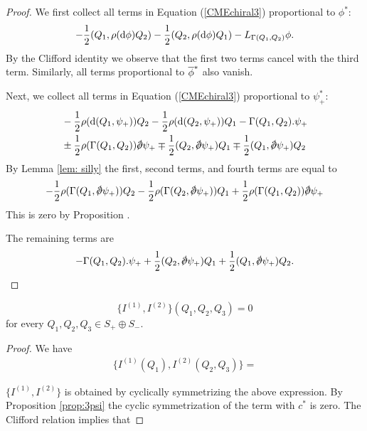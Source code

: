 \documentclass[10pt, oneside]{article}
\begin{document}
\begin{proof}
We first collect all terms in Equation (\ref{CMEchiral3}) proportional to $\phi^*$:
\[
- \frac{1}{2} (Q_1, \rho(\d\phi) Q_2) - \frac{1}{2} (Q_2, \rho(\d \phi) Q_1) - L_{\Gamma(Q_1,Q_2)} \phi .
\]
By the Clifford identity
 we observe that the first two terms cancel with the third term. 
Similarly, all terms proportional to $\Bar{\phi}^*$ also vanish. 

Next, we collect all terms in Equation (\ref{CMEchiral3}) proportional to $\psi_+^*$:
\begin{align*}
& - \frac{1}{2} \rho(\d(Q_1,\psi_+))Q_2 - \frac{1}{2} \rho(\d(Q_2, \psi_+)) Q_1 - \Gamma(Q_1,Q_2) . \psi_+
\\ 
& \pm \frac{1}{2} \rho(\Gamma(Q_1,Q_2)) \sd \dd \psi_+ \mp \frac{1}{2} (Q_2, \sd \dd \psi_+)Q_1 \mp \frac{1}{2} (Q_1, \sd \dd \psi_+)Q_2
\end{align*}
By Lemma \ref{lem: silly} the first, second terms, and fourth terms are equal to 
\[
-\frac{1}{2}   \rho(\Gamma(Q_1, \sd \dd \psi_+))Q_2 - \frac{1}{2}   \rho(\Gamma(Q_2, \sd \dd \psi_+))Q_1 + \frac{1}{2} \rho(\Gamma(Q_1,Q_2)) \sd \dd \psi_+
\]
This is zero by Proposition . 

The remaining terms are
\[
- \Gamma(Q_1,Q_2) . \psi_+ + \frac{1}{2} (Q_2, \sd \dd \psi_+)Q_1 + \frac{1}{2} (Q_1, \sd \dd \psi_+)Q_2 .
\]
\end{proof}

\begin{lemma}
\[\{I^{(1)}, I^{(2)}\}(Q_1, Q_2, Q_3) = 0\]
for every $Q_1, Q_2, Q_3\in S_+ \oplus S_-$.
\end{lemma}
\begin{proof}
We have
\begin{align*}
\{I^{(1)}(Q_1), I^{(2)}(Q_2, Q_3)\} = 
\end{align*}

$\{I^{(1)}, I^{(2)}\}$ is obtained by cyclically symmetrizing the above expression. By Proposition \ref{prop:3psi} the cyclic symmetrization of the term with $c^*$ is zero. The Clifford relation implies that
\end{proof}
\end{document}
